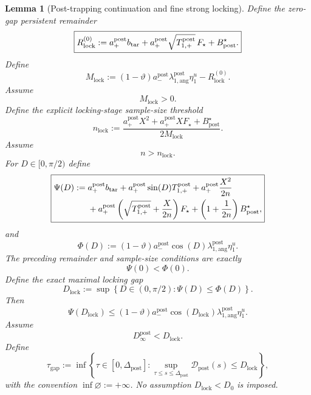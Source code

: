 \documentclass{article} %
\theoremstyle{plain}
\newtheorem{lemma}[theorem]{Lemma}
\theoremstyle{definition}
\theoremstyle{remark}
\begin{document}
\begin{lemma}[Post-trapping continuation and fine strong locking]

Define the zero-gap persistent remainder
\[
\boxed{
R_{\mathrm{lock}}^{(0)}
:=
a_+^{\mathrm{post}}b_{\rm tar}
+a_+^{\mathrm{post}}\sqrt{T_{1,+}^{\mathrm{post}}}\,F_\star
+
B_{\mathrm{post}}^\star.
}
\]
Define
\[
\boxed{
M_{\mathrm{lock}}
:=
(1-\vartheta)
a_-^{\mathrm{post}}
\lambda_{1,\mathrm{ang}}^{\mathrm{post}}\eta_1^u
-
R_{\mathrm{lock}}^{(0)}.
}
\]
Assume
\[
\boxed{M_{\mathrm{lock}}>0.}
\]
Define the explicit locking-stage sample-size threshold
\[
\boxed{
n_{\mathrm{lock}}
:=
\frac{
a_+^{\mathrm{post}}X^2
+
a_+^{\mathrm{post}}XF_\star
+
B_{\mathrm{post}}^\star
}{2M_{\mathrm{lock}}}.
}
\]
Assume
\[
\boxed{n>n_{\mathrm{lock}}.}
\]
For $D\in[0,\pi/2)$ define
\[
\boxed{
\begin{aligned}
\Psi(D)
:={}&
a_+^{\mathrm{post}}b_{\rm tar}
+a_+^{\mathrm{post}}\sin(D)T_{1,+}^{\mathrm{post}}
+
a_+^{\mathrm{post}}\frac{X^2}{2n}
\\
&+
a_+^{\mathrm{post}}
\left(\sqrt{T_{1,+}^{\mathrm{post}}}+\frac{X}{2n}\right)F_\star
+
\left(1+\frac1{2n}\right)B_{\mathrm{post}}^\star,
\end{aligned}
}
\]
and
\[
\boxed{
\Phi(D)
:=
(1-\vartheta)a_-^{\mathrm{post}}\cos(D)
\lambda_{1,\mathrm{ang}}^{\mathrm{post}}\eta_1^u.
}
\]
The preceding remainder and sample-size conditions are exactly
\[
\boxed{\Psi(0)<\Phi(0).}
\]
Define the exact maximal locking gap
\[
\boxed{
D_{\mathrm{lock}}
:=
\sup\left\{
D\in(0,\pi/2):\Psi(D)\le\Phi(D)
\right\}.
}
\]
Then
\[
\boxed{
\Psi(D_{\mathrm{lock}})
\le
(1-\vartheta)a_-^{\mathrm{post}}\cos(D_{\mathrm{lock}})
\lambda_{1,\mathrm{ang}}^{\mathrm{post}}\eta_1^u.
}
\]
Assume
\[
\boxed{D_\infty^{\mathrm{post}}<D_{\mathrm{lock}}.}
\]
Define
\[
\boxed{
\tau_{\mathrm{gap}}
:=
\inf\left\{
\tau\in[0,\Delta_{\mathrm{post}}]:
\sup_{\tau\le s\le\Delta_{\mathrm{post}}}
\mathcal D_{\mathrm{post}}(s)
\le
D_{\mathrm{lock}}
\right\},
}
\]
with the convention $\inf\varnothing:=+\infty$.  No assumption
$D_{\mathrm{lock}}<D_0$ is imposed.



\end{lemma}
\end{document}
